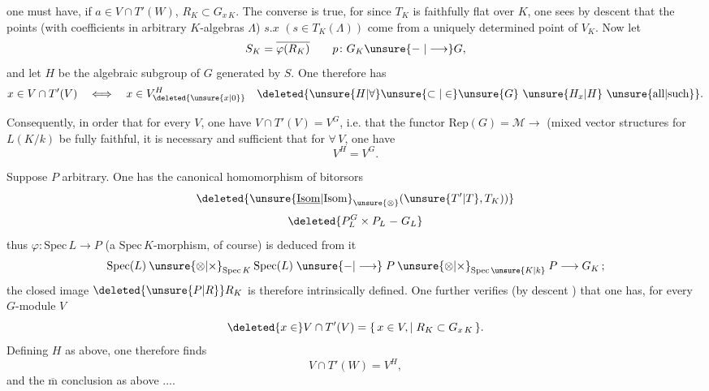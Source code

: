 one must have, if $a\in V\cap T'(W)$, $R_K\subset G_{x\,K}$. The converse is true, for since $T_K$ is faithfully flat over $K$, one sees by descent that the points (with coefficients in arbitrary $K$-algebras $\Lambda$) $s.x$ $(s\in T_K(\Lambda))$ come from a uniquely determined point of $V_K$. Now let \deleted{\unsure{$\xi$}}
\[
S_K=\overline{\varphi(R_K)}\qquad p\colon G_K\unsure{\mathrel{-}|\longrightarrow}G,
\]
and let $H$ be the  algebraic subgroup of $G$ generated by $S$. One therefore has
\[
x\in V\cap T'(V)\quad\Longleftrightarrow\quad x\in V_{\deleted{\unsure{x|0}}}^{H}\quad \deleted{\unsure{H|\forall}\unsure{\subset|\in}\unsure{G}\ \unsure{H_x|H}\ \text{\unsure{all|such}}}.
\]

Consequently, in order that  for every $V$, one have $V\cap T'(V)=V^G$, i.e. that the functor $\mathrm{Rep}(G)=\mathcal M\longrightarrow$ (mixed vector structures for $L(K/k)$ be fully faithful, it is necessary and sufficient that for $\forall\,V$,  one have
\[
V^H=V^G.
\]

Suppose $P$ arbitrary. One has the canonical homomorphism of bitorsors
\[
\deleted{\unsure{\underline{\mathrm{Isom}}|{\mathrm{Isom}}}_{\unsure{\otimes}}(\unsure{T'|T},T_K))}
\]
\[
\deleted{P_L^G\times P_L\mathrel{-}G_L}
\]
thus $\varphi\colon\mathrm{Spec}\,L\longrightarrow P$ (a $\mathrm{Spec}\,K$-morphism, of course) is deduced from it 
\[
\mathrm{Spec}(L)\mathbin{\unsure{\otimes|\times}}_{\mathrm{Spec}\,K}\mathrm{Spec}(L)\mathrel{\unsure{-|\longrightarrow}}
P\mathbin{\unsure{\otimes|\times}}_{\mathrm{Spec}\,\unsure{K|k}}P\longrightarrow G_K\,;
\]
the closed image $\deleted{\unsure{P|R}}R_K$ is therefore intrinsically defined. One further verifies (by descent ) that  one has, for every $G$-module $V$
\[
\deleted{x\in}V\cap T'(V)=\{\,x\in V,\mid R_K\subset G_{x\,K}\,\}.
\]
Defining $H$ as above, one therefore finds
\[
V\cap T'(W)=V^H,
\]
and the $\overline{\mathrm m}$ conclusion as above ....
{\centering %
\textit{ }\par}

